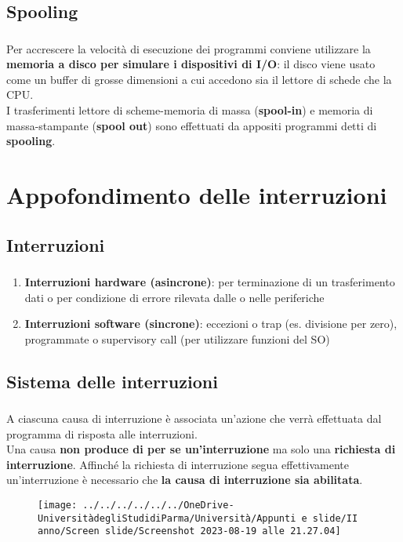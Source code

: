 \documentclass{beamer}
\newenvironment{mainframe}{
	\begin{frame}
		\frametitle{\insertsubsection}
		\framesubtitle{\insertsection}
	}{
	\end{frame}
}
\begin{document}
\subsection{Spooling}
\begin{mainframe}
	Per accrescere la velocità di esecuzione dei programmi conviene utilizzare la \textbf{memoria a disco per simulare i dispositivi di I/O}: il disco viene usato come un buffer di grosse dimensioni a cui accedono sia il lettore di schede che la CPU.\\
	I trasferimenti lettore di scheme-memoria di massa (\textbf{spool-in}) e memoria di massa-stampante (\textbf{spool out}) sono effettuati da appositi programmi detti di \textbf{spooling}.
\end{mainframe}
\section{Appofondimento delle interruzioni}
\subsection{Interruzioni}
\begin{mainframe}
	\begin{enumerate}
	\item	\textbf{Interruzioni hardware (asincrone)}: per terminazione di un trasferimento dati o per condizione di errore rilevata dalle o nelle periferiche
		\item \textbf{Interruzioni software (sincrone)}: eccezioni o trap (es. divisione per zero), programmate o supervisory call (per utilizzare funzioni del SO)
	\end{enumerate}
\end{mainframe}
\subsection{Sistema delle interruzioni}
\begin{mainframe}
	A ciascuna causa di interruzione è associata un'azione che verrà effettuata dal programma di risposta alle interruzioni.\\
	Una causa \textbf{non produce di per se un'interruzione} ma solo una \textbf{richiesta di interruzione}. Affinché la richiesta di interruzione segua effettivamente un'interruzione è necessario che \textbf{la causa di interruzione sia abilitata}.
	\begin{figure}
		\centering
		\texttt{[image: ../../../../../../OneDrive-UniversitàdegliStudidiParma/Università/Appunti e slide/II anno/Screen slide/Screenshot 2023-08-19 alle 21.27.04]}
	\end{figure}
\end{mainframe}
\end{document}
